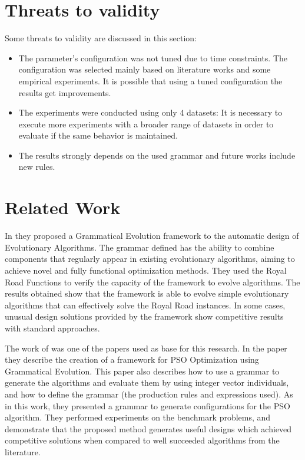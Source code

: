 \documentclass[journal]{IEEEtran}
\begin{document}
	
	\section{Threats to validity} \label{sec:threats}
	
	Some threats to validity are discussed in this section:
	
	\begin{itemize}
		\item The parameter's configuration was not tuned due to time constraints. The configuration was selected mainly based on literature works and some empirical experiments. It is possible that using a tuned configuration the results get improvements.
		\item The experiments were conducted using only 4 datasets: It is necessary to execute more experiments with a broader range of datasets in order to evaluate if the same behavior is maintained.
		\item The results strongly depends on the used grammar and future works include new rules.
	\end{itemize}
	
	
	\section{Related Work} \label{sec:related_work}
	
	In \cite{lourencco2012evolving} they proposed a Grammatical Evolution framework to the automatic design of Evolutionary Algorithms. The grammar defined has the ability to combine components that regularly appear in existing evolutionary algorithms, aiming to achieve novel and fully functional optimization methods. They used the Royal Road Functions to verify the capacity of the framework to evolve algorithms. The results obtained show that the framework is able to evolve simple evolutionary algorithms that can effectively solve the Royal Road instances. In some cases, unusual design solutions provided by the framework show competitive results with standard approaches.
	
	The work of \cite{miranda2015gefpso} was one of the papers used as base for this research. In the paper they describe the creation of a framework for PSO Optimization using Grammatical Evolution. This paper also describes how to use a grammar to generate the algorithms and evaluate them by using integer vector individuals, and how to define the grammar (the production rules and expressions used). As in this work, they presented a grammar to generate configurations for the PSO algorithm. They performed experiments on the benchmark problems, and demonstrate that the proposed method generates useful designs which achieved competitive solutions when compared to well succeeded algorithms from the literature.
	
\end{document}

